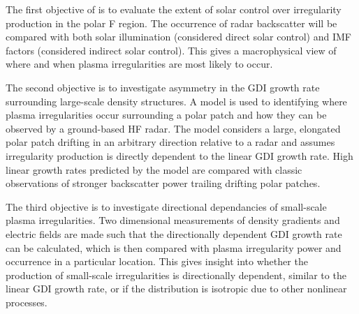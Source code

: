 The first objective of is to evaluate the extent of solar control over irregularity production in the polar F region.  The occurrence of radar backscatter will be compared with both solar illumination (considered direct solar control) and IMF factors (considered indirect solar control).  This gives a macrophysical view of where and when plasma irregularities are most likely to occur.

The second objective is to investigate asymmetry in the GDI growth rate surrounding large-scale density structures.  A model is used to identifying where plasma irregularities occur surrounding a polar patch and how they can be observed by a ground-based HF radar.  The model considers a large, elongated polar patch drifting in an arbitrary direction relative to a radar and assumes irregularity production is directly dependent to the linear GDI growth rate.  High linear growth rates predicted by the model are compared with classic observations of stronger backscatter power trailing drifting polar patches.

The third objective is to investigate directional dependancies of small-scale plasma irregularities.  Two dimensional measurements of density gradients and electric fields are made such that the directionally dependent GDI growth rate can be calculated, which is then compared with plasma irregularity power and occurrence in a particular location.  This gives insight into whether the production of small-scale irregularities is directionally dependent, similar to the linear GDI growth rate, or if the distribution is isotropic due to other nonlinear processes.


